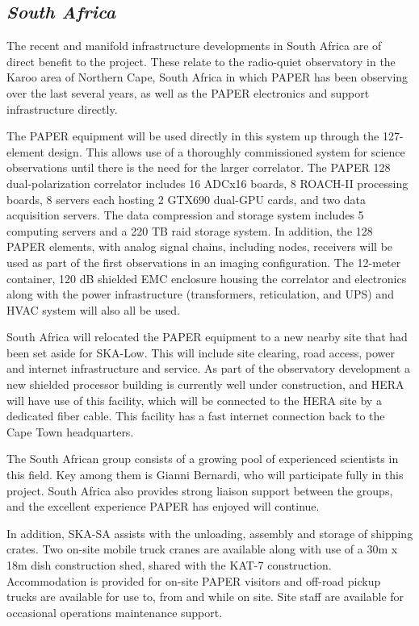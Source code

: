 \documentclass[11pt]{article}
\begin{document}
\subsection*{\it South Africa}

The recent and manifold infrastructure developments in South Africa are of direct benefit to the project.  These relate to the radio-quiet observatory in the Karoo area of Northern Cape, South Africa in which PAPER has been observing over the last several years, as well as the PAPER electronics and support infrastructure directly.

The PAPER equipment will be used directly in this system up through the 127-element design.  This allows use of a thoroughly commissioned system for science observations until there is the need for the larger correlator.  The PAPER 128 dual-polarization correlator includes 16 ADCx16 boards,  8 ROACH-II processing boards, 8 servers each hosting 2 GTX690 dual-GPU cards,
and two data acquisition servers.  The data compression and storage system includes 5 computing servers and a 220 TB raid storage system.  In addition, the 128 PAPER elements, with analog signal chains, including nodes, receivers will be used as part of the first observations in an imaging configuration. The 12-meter container, 120 dB shielded EMC enclosure housing the correlator and electronics along with the power infrastructure (transformers, reticulation, and UPS) and HVAC system will also all be used.

South Africa will relocated the PAPER equipment to a new nearby site that had been set aside for SKA-Low.  This will include site clearing, road access, power and internet infrastructure and service.  As part of the observatory development a new shielded processor building is currently well under construction, and HERA will have use of this facility, which will be connected to the HERA site by a dedicated fiber cable.  This facility has a fast internet connection back to the Cape Town headquarters.

The South African group consists of a growing pool of experienced scientists in this field.  Key among them is Gianni Bernardi, who will participate fully in this project.  South Africa also provides strong liaison support between the groups, and the excellent experience PAPER has enjoyed will continue.

In addition, SKA-SA assists with the unloading, assembly and storage of
shipping crates. Two on-site mobile truck cranes are available along with use
of a 30m x 18m dish construction shed, shared with the KAT-7 construction.
Accommodation is provided for on-site PAPER visitors and off-road pickup trucks
are available for use to, from and while on site.  Site staff are available for occasional operations maintenance support.
\end{document}
